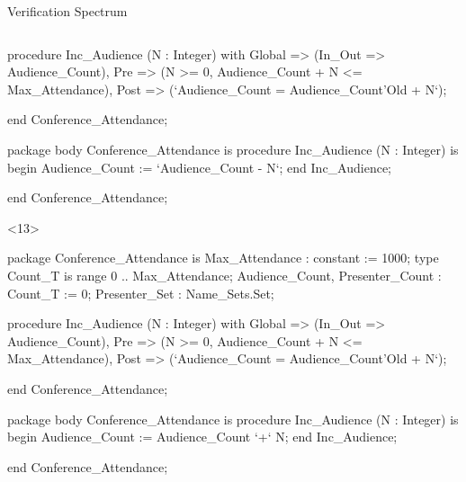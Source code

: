 \documentclass{beamer}
\begin{document}
\begin{frame}[fragile]{Verification Spectrum}
\begin{columns}
\begin{column}{9cm}
\begin{onlyenv}
\begin{pxcode}[language=SPARK,style=magic,gobble=8]
           procedure Inc_Audience (N : Integer)
           with Global => (In_Out => Audience_Count),
                Pre    => (N >= 0, Audience_Count + N <= Max_Attendance),
                Post   => (`Audience_Count = Audience_Count'Old + N`);

        end Conference_Attendance;

        package body Conference_Attendance
        is
           procedure Inc_Audience (N : Integer)
           is
           begin
              Audience_Count := `Audience_Count - N`;
           end Inc_Audience;

        end Conference_Attendance;
      \end{pxcode}
      \end{onlyenv}

      \begin{onlyenv}<13>
      \begin{pxcode}[language=SPARK,style=magic,gobble=8]
        package Conference_Attendance
        is
           Max_Attendance : constant := 1000;
           type Count_T is range 0 .. Max_Attendance;
           Audience_Count, Presenter_Count : Count_T := 0;
           Presenter_Set : Name_Sets.Set;

           procedure Inc_Audience (N : Integer)
           with Global => (In_Out => Audience_Count),
                Pre    => (N >= 0, Audience_Count + N <= Max_Attendance),
                Post   => (`Audience_Count = Audience_Count'Old + N`);

        end Conference_Attendance;

        package body Conference_Attendance
        is
           procedure Inc_Audience (N : Integer)
           is
           begin
              Audience_Count := Audience_Count `+` N;
           end Inc_Audience;

        end Conference_Attendance;
      \end{pxcode}
      \end{onlyenv}





    \end{column}
  \end{columns}

\end{frame}
\end{document}
